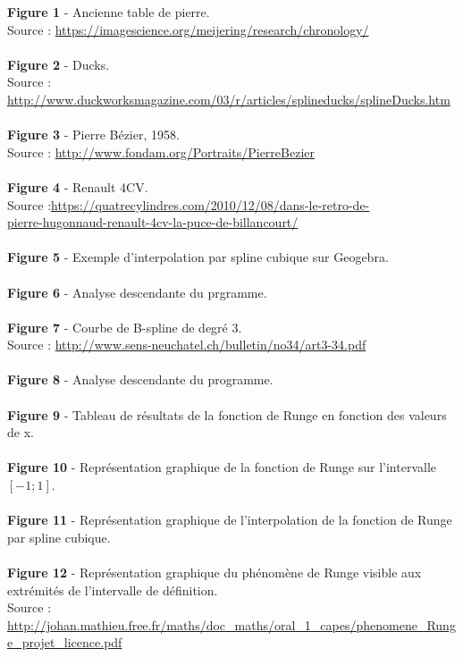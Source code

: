 \documentclass{article}
\begin{document}
\begingroup\raggedleft
\textbf{Figure 1} - Ancienne table de pierre.
\endgroup
\\Source : \url{https://imagescience.org/meijering/research/chronology/}
\\
\\
\textbf{Figure 2} - Ducks.
\\Source : \url{http://www.duckworksmagazine.com/03/r/articles/splineducks/splineDucks.htm}
\\
\\
\textbf{Figure 3} - Pierre B\'ezier, 1958.
\\Source : \url{http://www.fondam.org/Portraits/PierreBezier}
\\
\\
\textbf{Figure 4} - Renault 4CV.
\\Source :\url{https://quatrecylindres.com/2010/12/08/dans-le-retro-de-}
\\\url{pierre-hugonnaud-renault-4cv-la-puce-de-billancourt/}
\\
\\
\textbf{Figure 5} - Exemple d'interpolation par spline cubique sur Geogebra.
\\
\\
\textbf{Figure 6} - Analyse descendante du prgramme.
\\
\\
\textbf{Figure 7} - Courbe de B-spline de degr\'e 3.
\\Source : \url{http://www.sens-neuchatel.ch/bulletin/no34/art3-34.pdf}
\\
\\
\textbf{Figure 8} - Analyse descendante du programme.
\\
\\
\textbf{Figure 9} - Tableau de r\'esultats de la fonction de Runge en fonction des valeurs de x.
\\
\\
\textbf{Figure 10} - Repr\'esentation graphique de la fonction de Runge sur l'intervalle $[-1;1]$.
\\
\\
\textbf{Figure 11} - Repr\'esentation graphique de l'interpolation de la fonction de Runge par spline cubique.
\\
\\
\textbf{Figure 12} - Repr\'esentation graphique du ph\'enom\`ene de Runge visible aux extr\'emit\'es de l'intervalle de d\'efinition.
\\Source : \url{http://johan.mathieu.free.fr/maths/doc_maths/oral_1_capes/phenomene_Runge_projet_licence.pdf}
\end{document}

